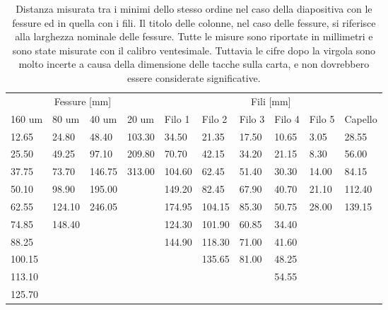 \begin{table}[t!]
    \centering
    \footnotesize
    \begin{tabular}{l l l l | l l l l l l}
        \toprule
        \multicolumn{4}{c|}{Fessure [mm]} & \multicolumn{6}{c}{Fili [mm]}  \\
        160 um&    80 um&    40 um&    20 um&  Filo 1&  Filo 2&  Filo 3& Filo 4& Filo 5& Capello \\
        \midrule
        12.65&     24.80&    48.40&   103.30& 34.50&    21.35&   17.50&  10.65&  3.05&   28.55  \\
        25.50&     49.25&    97.10&   209.80& 70.70&    42.15&   34.20&  21.15&  8.30&   56.00  \\
        37.75&     73.70&   146.75&   313.00& 104.60&   62.45&   51.40&  30.30&  14.00&  84.15  \\
        50.10&     98.90&   195.00&         & 149.20&   82.45&   67.90&  40.70&  21.10&  112.40 \\
        62.55&    124.10&   246.05&         & 174.95&   104.15&  85.30&  50.75&  28.00&  139.15 \\
        74.85&    148.40&&                  & 124.30&   101.90&  60.85&  34.40&       &         \\      
        88.25&&&                            & 144.90&   118.30&  71.00&  41.60&       &         \\
        100.15&&&                           &       &   135.65&  81.00&  48.25&       &         \\
        113.10&&&                           &       &        &       &   54.55&       &         \\
        125.70&&&                           &       &        &       &        &       &         \\
        \bottomrule
    \end{tabular}
    \caption{Distanza misurata tra i minimi dello stesso ordine nel caso della diapositiva con le fessure ed
        in quella con i fili. Il titolo delle colonne, nel caso delle fessure, si riferisce alla larghezza nominale delle fessure.
        Tutte le misure sono riportate in millimetri e sono state misurate con il calibro ventesimale. Tuttavia
        le cifre dopo la virgola sono molto incerte a causa della dimensione delle tacche sulla carta, e non dovrebbero
        essere considerate significative.}
    \label{tab:ff}
\end{table}

